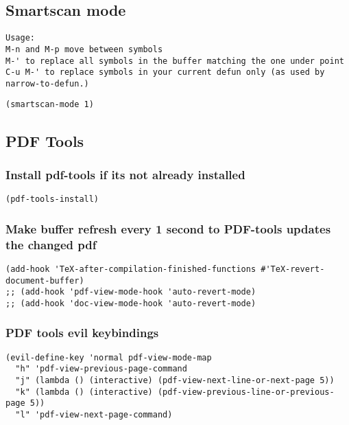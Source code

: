 \documentclass[11pt]{article}
\begin{document}
\subsection*{Smartscan mode}
\label{sec:org9b16b1c}
\begin{verbatim}
Usage:
M-n and M-p move between symbols
M-' to replace all symbols in the buffer matching the one under point
C-u M-' to replace symbols in your current defun only (as used by narrow-to-defun.)
\end{verbatim}

\begin{verbatim}
(smartscan-mode 1)
\end{verbatim}


\subsection*{PDF Tools}
\label{sec:org25e3c6f}

\subsubsection*{Install pdf-tools if its not already installed}
\label{sec:org187d80c}
\begin{verbatim}
(pdf-tools-install)
\end{verbatim}


\subsubsection*{Make buffer refresh every 1 second to PDF-tools updates the changed pdf}
\label{sec:org9ede917}
\begin{verbatim}
(add-hook 'TeX-after-compilation-finished-functions #'TeX-revert-document-buffer)
;; (add-hook 'pdf-view-mode-hook 'auto-revert-mode) 
;; (add-hook 'doc-view-mode-hook 'auto-revert-mode) 
\end{verbatim}


\subsubsection*{PDF tools evil keybindings}
\label{sec:orgcc980f2}
\begin{verbatim}
(evil-define-key 'normal pdf-view-mode-map
  "h" 'pdf-view-previous-page-command
  "j" (lambda () (interactive) (pdf-view-next-line-or-next-page 5))
  "k" (lambda () (interactive) (pdf-view-previous-line-or-previous-page 5))
  "l" 'pdf-view-next-page-command)
\end{verbatim}
\end{document}

